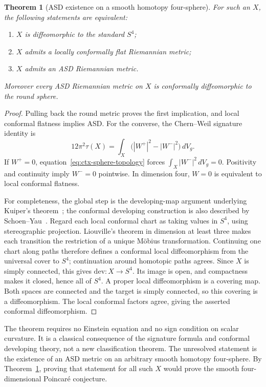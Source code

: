\documentclass[11pt]{article}
\numberwithin{equation}{section}
\newtheorem{theorem}{Theorem}[section]
\theoremstyle{definition}
\theoremstyle{remark}
\begin{document}
\begin{theorem}[ASD existence on a smooth homotopy four-sphere]
\label{thm:ctx-ASD-sphere}
For such an $X$, the following statements are equivalent:
\begin{enumerate}
 \item $X$ is diffeomorphic to the standard $S^4$;
 \item $X$ admits a locally conformally flat Riemannian metric;
 \item $X$ admits an ASD Riemannian metric.
\end{enumerate}
Moreover every ASD Riemannian metric on $X$ is conformally
diffeomorphic to the round sphere.
\end{theorem}
\begin{proof}
Pulling back the round metric proves the first implication, and local
conformal flatness implies ASD.  For the converse, the
Chern--Weil signature identity\cite{Hirzebruch1971Signature} is
\begin{equation}\label{eq:ctx-signature}
 12\pi^2\tau(X)
 =\int_X\bigl(|W^+|^2-|W^-|^2\bigr)\,dV_g.
\end{equation}
If $W^+=0$, equation~\eqref{eq:ctx-sphere-topology} forces
$\int_X|W^-|^2\,dV_g=0$.  Positivity and continuity imply $W^-=0$
pointwise.  In dimension four, $W=0$ is equivalent to local conformal
flatness.

For completeness, the global step is the developing-map argument
underlying Kuiper's theorem~\cite{Kuiper1949}; the conformal developing
construction is also described by Schoen--Yau~\cite{SchoenYau1988Conformal}.  Regard each local
conformal chart as taking values in $S^4$, using stereographic
projection.  Liouville's theorem in dimension at least three makes
each transition the restriction of a unique M\"obius transformation.
Continuing one chart along paths therefore defines a conformal local
diffeomorphism from the universal cover to $S^4$; continuation around
homotopic paths agrees.  Since $X$ is simply connected, this gives
$\mathrm{dev}:X\to S^4$.  Its image is open, and compactness makes it
closed, hence all of $S^4$.  A proper local diffeomorphism is a
covering map.  Both spaces are connected and the target is simply
connected, so this covering is a diffeomorphism.  The local conformal
factors agree, giving the asserted conformal diffeomorphism.
\end{proof}

The theorem requires no Einstein equation and no sign condition on
scalar curvature.  It is a classical consequence of the signature
formula and conformal developing theory, not a new classification
theorem.  The unresolved statement is the existence of an ASD metric
on an arbitrary smooth homotopy four-sphere.  By
Theorem~\ref{thm:ctx-ASD-sphere}, proving that statement for all such
$X$ would prove the smooth four-dimensional Poincar\'e conjecture.
\end{document}

